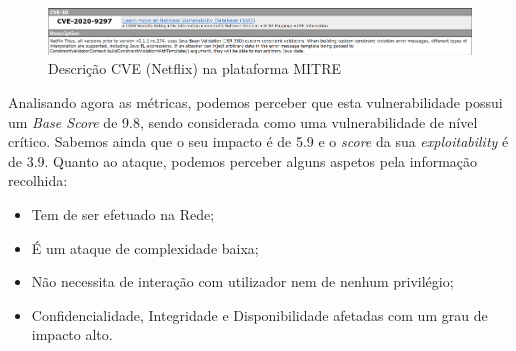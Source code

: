 \documentclass[11t]{article}
\begin{document}
\vspace{0.2cm}

\begin{figure}[H]
    \centering
    \includegraphics[width=\textwidth]{images/descricaoNetflix.png}
    \caption{Descrição CVE (Netflix) na plataforma MITRE}
\end{figure}

\clearpage

Analisando agora as métricas, podemos perceber que esta vulnerabilidade possui um \textit{Base Score} de 9.8, sendo considerada como uma vulnerabilidade de nível crítico. Sabemos ainda que o seu impacto é de 5.9 e o \textit{score} da sua \textit{exploitability} é de 3.9. Quanto ao ataque, podemos perceber alguns aspetos pela informação recolhida:
\begin{itemize}
    \item Tem de ser efetuado na Rede;
    \item É um ataque de complexidade baixa;
    \item Não necessita de interação com utilizador nem de nenhum privilégio;
    \item Confidencialidade, Integridade e Disponibilidade afetadas com um grau de impacto alto.
\end{itemize}

\vspace{0.1cm}
\end{document}
